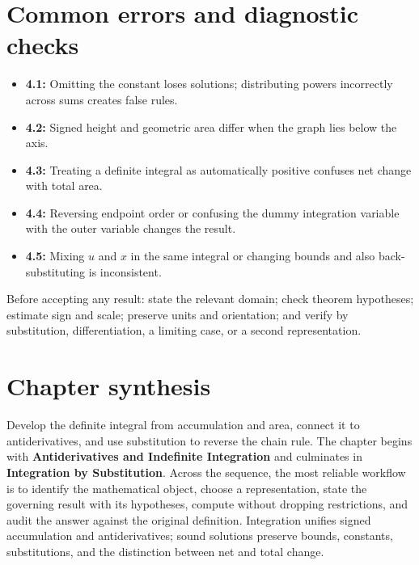 \documentclass[11pt]{article}
\begin{document}
\section{Common errors and diagnostic checks}
\begin{warningbox}
\begin{itemize}
\item \textbf{4.1:} Omitting the constant loses solutions; distributing powers incorrectly across sums creates false rules.
\item \textbf{4.2:} Signed height and geometric area differ when the graph lies below the axis.
\item \textbf{4.3:} Treating a definite integral as automatically positive confuses net change with total area.
\item \textbf{4.4:} Reversing endpoint order or confusing the dummy integration variable with the outer variable changes the result.
\item \textbf{4.5:} Mixing $u$ and $x$ in the same integral or changing bounds and also back-substituting is inconsistent.
\end{itemize}
\end{warningbox}
\begin{checkbox}
Before accepting any result: state the relevant domain; check theorem hypotheses; estimate sign and scale; preserve units and orientation; and verify by substitution, differentiation, a limiting case, or a second representation.
\end{checkbox}

\section{Chapter synthesis}
Develop the definite integral from accumulation and area, connect it to antiderivatives, and use substitution to reverse the chain rule. The chapter begins with \textbf{Antiderivatives and Indefinite Integration} and culminates in \textbf{Integration by Substitution}. Across the sequence, the most reliable workflow is to identify the mathematical object, choose a representation, state the governing result with its hypotheses, compute without dropping restrictions, and audit the answer against the original definition. Integration unifies signed accumulation and antiderivatives; sound solutions preserve bounds, constants, substitutions, and the distinction between net and total change.
\end{document}
